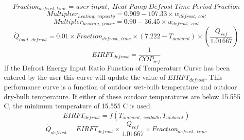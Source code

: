 \begin{equation}
Fraction_{defrost, time} = user\; input,\; Heat\; Pump\; Defrost\; Time\; Period\; Fraction
\end{equation}
\begin{equation}
Multiplier_{heating,\; capacity} = {0.909 - 107.33 \times w_{defrost,\; coil}}
\end{equation}
\begin{equation}
Multipler_{heating,\; power} = {0.90 - 36.45 \times w_{defrost,\; coil}}
\end{equation}
\begin{equation}
\dot{Q}_{load,\; defrost} = {0.01 \times Fraction_{defrost,\; time} \times (7.222 - T_{ambient}) \times (\frac{Q_{ref}}{1.01667})}
\end{equation}
\begin{equation}
EIRFT_{defrost} = \frac{1}{COP_{ref}}
\end{equation}
If the Defrost Energy Input Ratio Function of Temperature Curve has been entered by the user this curve will update the value of $EIRFT_{defrost}$. This performance curve is a function of outdoor wet-bulb temperature and outdoor dry-bulb temperature. If either of these outdoor temperatures are below 15.555 C, the minimum temperature of 15.555 C is used.
\begin{equation}
{EIRFT_{defrost} = f(T_{ambient,\; wetbulb}, T_{ambient})}
\end{equation}
\begin{equation}
\dot{Q}_{defrost} = EIRFT_{defrost} \times \frac{Q_{ref}}{1.01667} \times Fraction_{defrost,\; time}
\end{equation}


